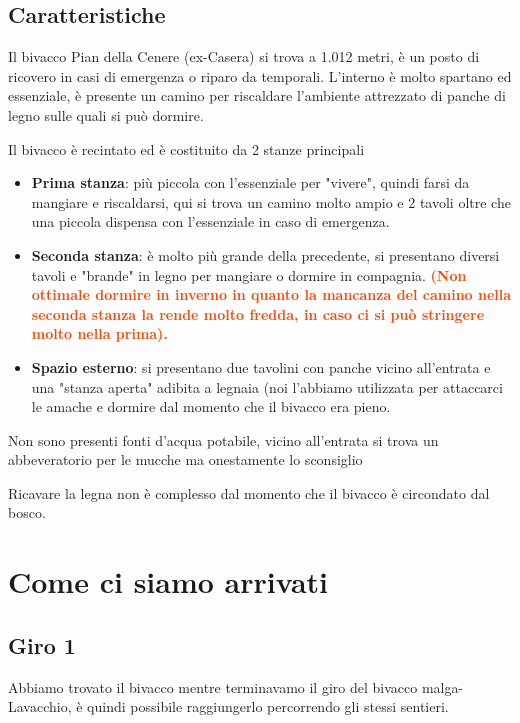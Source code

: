 \documentclass{article}
\begin{document}
\subsection{Caratteristiche}
Il bivacco Pian della Cenere (ex-Casera) si trova a 1.012 metri, è un posto di ricovero in casi di emergenza o riparo da temporali. L'interno è molto spartano ed essenziale, è presente un camino per riscaldare l'ambiente attrezzato di panche di legno sulle quali si può dormire.
 
Il bivacco è recintato ed è costituito da 2 stanze principali
\begin{itemize}
    \item \textbf{Prima stanza}: più piccola con l'essenziale per "vivere", quindi farsi da mangiare e riscaldarsi, qui si trova un camino molto ampio e 2 tavoli oltre che una piccola dispensa con l'essenziale in caso di emergenza.
    \item \textbf{Seconda stanza}: è molto più grande della precedente, si presentano diversi tavoli e "brande" in legno per mangiare o dormire in compagnia. \textbf{\textcolor{OrangeRed}{(Non ottimale dormire in inverno in quanto la mancanza del camino nella seconda stanza la rende molto fredda, in caso ci si può stringere molto nella prima).}}
    \item \textbf{Spazio esterno}: si presentano due tavolini con panche vicino all'entrata e una "stanza aperta" adibita a legnaia (noi l'abbiamo utilizzata per attaccarci le amache e dormire dal momento che il bivacco era pieno.
\end{itemize}

Non sono presenti fonti d'acqua potabile, vicino all'entrata si trova un abbeveratorio per le mucche ma onestamente lo sconsiglio

Ricavare la legna non è complesso dal momento che il bivacco è circondato dal bosco.

\section{Come ci siamo arrivati}
\subsection{Giro 1}
Abbiamo trovato il bivacco mentre terminavamo il giro del bivacco malga-Lavacchio, è quindi possibile raggiungerlo percorrendo gli stessi sentieri.
\end{document}
